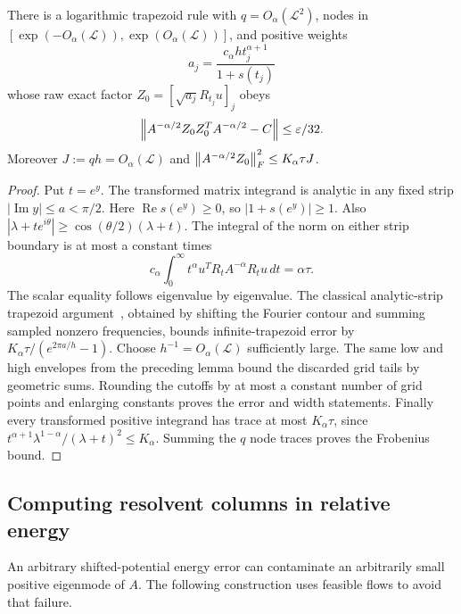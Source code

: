 \begin{lemma}
There is a logarithmic trapezoid rule with $q=O_\alpha(\mathcal L^2)$,
nodes in $[\exp(-O_\alpha(\mathcal L)),
\exp(O_\alpha(\mathcal L))]$, and positive weights
\[
 a_j=\frac{c_\alpha h t_j^{\alpha+1}}{1+s(t_j)}
\]
whose raw exact factor $Z_0=[\sqrt{a_j}R_{t_j}u]_j$ obeys
\[
 \left\lVert A^{-\alpha/2}Z_0Z_0^TA^{-\alpha/2}-C\right\rVert
 \le\varepsilon/32.
\]
Moreover $J:=qh=O_\alpha(\mathcal L)$ and
$\left\lVert A^{-\alpha/2}Z_0\right\rVert_F^2\le K_\alpha\tau J$.
\end{lemma}
\begin{proof}
Put $t=e^y$. The transformed matrix integrand is analytic in any fixed
strip $|\operatorname{Im}y|\le a<\pi/2$. Here
$\operatorname{Re}s(e^y)\ge0$, so $|1+s(e^y)|\ge1$.
Also $|\lambda+te^{i\theta}|\ge\cos(\theta/2)(\lambda+t)$.
The integral of the norm on either strip boundary is at most a constant
times
\[
 c_\alpha\int_0^\infty t^\alpha
       u^T R_t A^{-\alpha}R_tu\,dt=\alpha\tau.
\]
The scalar equality follows eigenvalue by eigenvalue. The classical analytic-strip trapezoid argument~\cite{TW}, obtained by
shifting the Fourier contour and summing sampled nonzero frequencies, bounds
infinite-trapezoid error by
$K_\alpha\tau/(e^{2\pi a/h}-1)$.
Choose $h^{-1}=O_\alpha(\mathcal L)$ sufficiently large.
The same low and high envelopes from the preceding lemma bound the
discarded grid tails by geometric sums. Rounding the cutoffs by at
most a constant number of grid points and enlarging constants proves
the error and width statements.
Finally every transformed positive integrand has trace at most
$K_\alpha\tau$, since
$t^{\alpha+1}\lambda^{1-\alpha}/(\lambda+t)^2\le K_\alpha$.
Summing the $q$ node traces proves the Frobenius bound.
\end{proof}

\subsection{Computing resolvent columns in relative energy}
An arbitrary shifted-potential energy error can contaminate an
arbitrarily small positive eigenmode of $A$. The following construction
uses feasible flows to avoid that failure.

